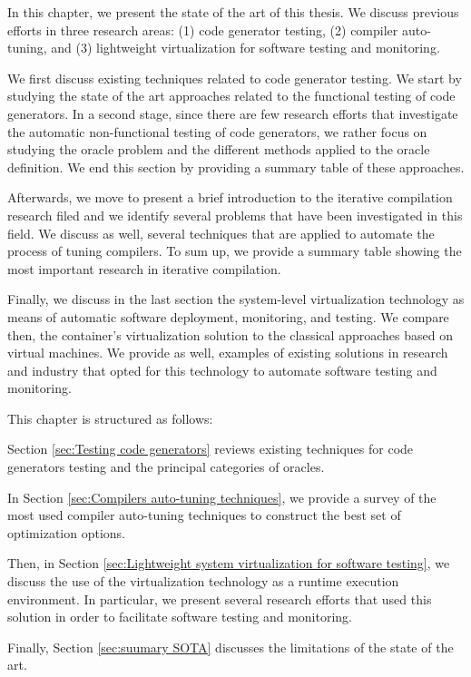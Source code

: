 
In this chapter, we present the state of the art of this thesis. We discuss previous efforts in three research areas: (1) code generator testing, (2) compiler auto-tuning, and (3) lightweight virtualization for software testing and monitoring.

We first discuss existing techniques related to code generator testing. We start by studying the state of the art approaches related to the functional testing of code generators. In a second stage, since there are few research efforts that investigate the automatic non-functional testing of code generators, we rather focus on studying the oracle problem and the different methods applied to the oracle definition. We end this section by providing a summary table of these approaches.

Afterwards, we move to present a brief introduction to the iterative compilation research filed and we identify several problems that have been investigated in this field. We discuss as well, several techniques that are applied to automate the process of tuning compilers. To sum up, we provide a summary table showing the most important research in iterative compilation.

Finally, we discuss in the last section the system-level virtualization technology as means of automatic software deployment, monitoring, and testing. We compare then, the container's virtualization solution to the classical approaches based on virtual machines. We provide as well, examples of existing solutions in research and industry that opted for this technology to automate software testing and monitoring.

This chapter is structured as follows: 

Section \ref{sec:Testing code generators} reviews existing techniques for code generators testing and the principal categories of oracles. 

In Section \ref{sec:Compilers auto-tuning techniques}, we provide a survey of the most used compiler auto-tuning techniques to construct the best set of optimization options. 

Then, in Section \ref{sec:Lightweight system virtualization for software testing}, we discuss the use of the virtualization technology as a runtime execution environment. In particular, we present several research efforts that used this solution in order to facilitate software testing and monitoring. 

Finally, Section \ref{sec:suumary SOTA} discusses the limitations of the state of the art.


